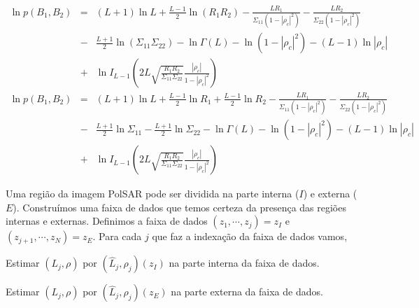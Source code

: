 \documentclass[remotesensing,article,submit,moreauthors,pdftex]{Definitions/mdpi}
\begin{document}
\begin{equation}\nonumber
\begin{array}{ccc}
	\ln p(B_1,B_2)&=&(L+1)\ln L +\frac{L-1}{2} \ln (R_1R_2) -\frac{LR_1}{\Sigma_{11}(1-|\rho_c|^2)}-\frac{LR_2}{\Sigma_{22}(1-|\rho_c|^2)}\\
	&-&\frac{L+1}{2}\ln(\Sigma_{11}\Sigma_{22}) - \ln\Gamma(L)- \ln(1-|\rho_c|^2)-(L-1)\ln|\rho_c|\\
	&+&\ln I_{L-1}\left(2L\sqrt{\frac{R_1R_2}{\Sigma_{11}\Sigma_{22}}}\frac{|\rho_c|}{1-|\rho_c|^2}\right)
\end{array}
\end{equation}
\begin{equation}\label{fun_log_biv_inten}
\begin{array}{ccc}
	\ln p(B_1,B_2)&=&(L+1)\ln L +\frac{L-1}{2} \ln R_1 +\frac{L-1}{2} \ln R_2 -\frac{LR_1}{\Sigma_{11}(1-|\rho_c|^2)}-\frac{LR_2}{\Sigma_{22}(1-|\rho_c|^2)}\\
	&-&\frac{L+1}{2}\ln\Sigma_{11}-\frac{L+1}{2}\ln\Sigma_{22} - \ln\Gamma(L)- \ln(1-|\rho_c|^2)-(L-1)\ln|\rho_c|\\
	&+&\ln I_{L-1}\left(2L\sqrt{\frac{R_1R_2}{\Sigma_{11}\Sigma_{22}}}\frac{|\rho_c|}{1-|\rho_c|^2}\right)
\end{array}
\end{equation}

Uma região da imagem PolSAR pode ser dividida na parte interna ($I$) e externa ($E$). Construímos uma faixa de dados que temos certeza da presença das regiões internas e externas. Definimos a faixa de dados $(z_1, \cdots,z_j)= z_I$ e $(z_{j+1}, \cdots,z_N)= z_E$. Para cada $j$ que faz a indexação da faixa de dados vamos,
  
Estimar $(L_j, \rho )$ por $(\hat{L}_j, \hat{\rho}_j)(z_I)$ na parte interna da faixa de dados.

Estimar $(L_j, \rho )$ por $(\hat{L}_j, \hat{\rho}_j)(z_E)$ na parte externa da faixa de dados.
\end{document}
